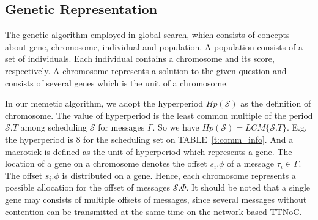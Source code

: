 \documentclass[10pt,journal]{IEEEtran}
\newcommand{\calS}{\mathcal{S}}
\theoremstyle{remark}
\begin{document}
\subsection{Genetic Representation}

The genetic algorithm employed in global search, which consists of concepts about gene, chromosome,
 individual and population. 
A population consists of a set of individuals. 
Each individual contains a chromosome and its score, respectively.
A chromosome represents a solution to the given question and consists of several genes which is the unit of a chromosome.

In our memetic algorithm,
 we adopt the hyperperiod $Hp(\calS)$ as the definition of chromosome.
The value of hyperperiod is the least common multiple of the period $\calS.T$ among scheduling $\calS$ for messages $\Gamma$.
So we have $Hp(\calS) = LCM\{\calS.T\}$.
E.g. the hyperperiod is 8 for the scheduling set on TABLE~\ref{t:comm_info}. 
And a macrotick is defined as the unit of hyperperiod which represents a gene.
The location of a gene on a chromosome denotes the offset $ s_i.\phi $ of a message $\tau_i\in\Gamma$.
The offset $s_i.\phi$ is distributed on a gene.
Hence, each chromosome represents a possible allocation for the offset of messages $\calS.\Phi$.
It should be noted that a single gene may consists of multiple offsets of messages,
 since several messages without contention can be transmitted at the same time on the network-based TTNoC.
\end{document}
